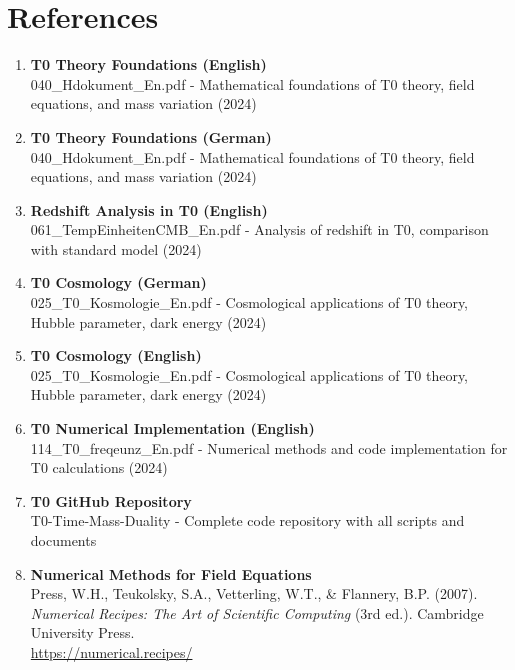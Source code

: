 	\section{References}
	
	\begin{enumerate}
		\item \textbf{T0 Theory Foundations (English)} \\
		040\_Hdokument\_En.pdf - Mathematical foundations of T0 theory, field equations, and mass variation (2024)
		
		\item \textbf{T0 Theory Foundations (German)} \\
		040\_Hdokument\_En.pdf - Mathematical foundations of T0 theory, field equations, and mass variation (2024)
		
		\item \textbf{Redshift Analysis in T0 (English)} \\
		061\_TempEinheitenCMB\_En.pdf - Analysis of redshift in T0, comparison with standard model (2024)
		
		\item \textbf{T0 Cosmology (German)} \\
		025\_T0\_Kosmologie\_En.pdf - Cosmological applications of T0 theory, Hubble parameter, dark energy (2024)
		
		\item \textbf{T0 Cosmology (English)} \\
		025\_T0\_Kosmologie\_En.pdf - Cosmological applications of T0 theory, Hubble parameter, dark energy (2024)
		
		\item \textbf{T0 Numerical Implementation (English)} \\
		114\_T0\_freqeunz\_En.pdf - Numerical methods and code implementation for T0 calculations (2024)
		
		\item \textbf{T0 GitHub Repository} \\
		T0-Time-Mass-Duality - Complete code repository with all scripts and documents
		
		\item \textbf{Numerical Methods for Field Equations} \\
		Press, W.H., Teukolsky, S.A., Vetterling, W.T., \& Flannery, B.P. (2007). \textit{Numerical Recipes: The Art of Scientific Computing} (3rd ed.). Cambridge University Press.\\
		\url{https://numerical.recipes/}
		

\end{enumerate}
